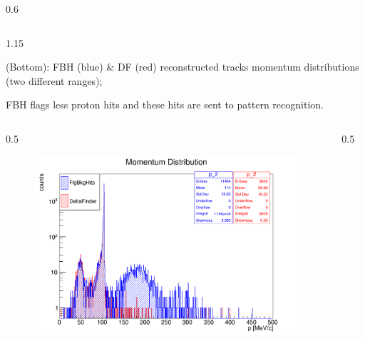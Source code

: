 \documentclass{beamer}
\begin{document}
\begin{frame}
\begin{columns}
\begin{column}{0.6\framewidth}
        \end{column}
    \end{columns}
    \vspace{-4mm}
 \begin{columns}
        \begin{column}{1.15\framewidth}
    \setlength{\leftmargini}{1.1em}
    \begin{itemize}
    {\footnotesize   
    \item (Bottom): FBH (blue) \& DF (red) reconstructed tracks momentum distributions (two different ranges);
    \item FBH flags less proton hits and these hits are sent to pattern recognition.
    }
    \end{itemize}
    \end{column}
    \end{columns}
        \vspace{-6mm}
     \begin{columns}
        \begin{column}{0.5\framewidth}
            \begin{figure}[!h]
        \centering
        \includegraphics[width =1.1\columnwidth]{figures/png/Screenshot_20240820_162125.png}
       \label{fig:momhits}
\end{figure}
        \end{column}
        \begin{column}{0.5\framewidth}
               \begin{figure}[!h]
        \centering

\end{figure}
\end{column}
\end{columns}
\end{frame}
\end{document}
